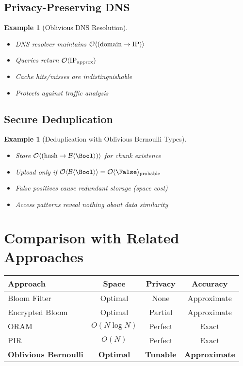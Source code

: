 \documentclass[11pt,final,hidelinks]{article}
\newcommand{\BernBool}{\mathcal{B}\langle \Bool \rangle}
\newtheorem{example}[theorem]{Example}
\begin{document}
\subsection{Privacy-Preserving DNS}

\begin{example}[Oblivious DNS Resolution]
\begin{itemize}
    \item DNS resolver maintains $\mathcal{O}\langle (\text{domain} \to \text{IP}) \rangle$
    \item Queries return $\mathcal{O}\langle \text{IP}_{\text{approx}} \rangle$
    \item Cache hits/misses are indistinguishable
    \item Protects against traffic analysis
\end{itemize}
\end{example}

\subsection{Secure Deduplication}

\begin{example}[Deduplication with Oblivious Bernoulli Types]
\begin{itemize}
    \item Store $\ObvMap{\text{hash}}{\BernBool}$ for chunk existence
    \item Upload only if $\Obv{\BernBool} = \Obv{\False}_{\text{probable}}$
    \item False positives cause redundant storage (space cost)
    \item Access patterns reveal nothing about data similarity
\end{itemize}
\end{example}

\section{Comparison with Related Approaches}

\begin{center}
\begin{tabular}{lccc}
\toprule
\textbf{Approach} & \textbf{Space} & \textbf{Privacy} & \textbf{Accuracy} \\
\midrule
Bloom Filter & Optimal & None & Approximate \\
Encrypted Bloom & Optimal & Partial & Approximate \\
ORAM & $O(N \log N)$ & Perfect & Exact \\
PIR & $O(N)$ & Perfect & Exact \\
\textbf{Oblivious Bernoulli} & \textbf{Optimal} & \textbf{Tunable} & \textbf{Approximate} \\
\bottomrule
\end{tabular}
\end{center}
\end{document}
